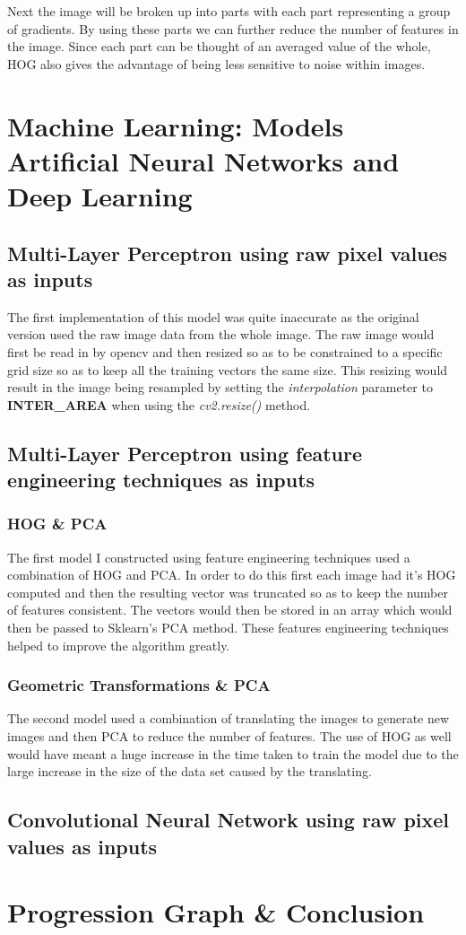 \documentclass[notitlepage]{report}
\begin{document}
Next the image will be broken up into parts with each part representing a group of gradients. By using these parts we can further reduce the number of features in the image. Since each part can be thought of an averaged value of the whole, HOG also gives the advantage of being less sensitive to noise within images.

\chapter{Machine Learning: Models Artificial Neural Networks and Deep Learning}
\section{Multi-Layer Perceptron using raw pixel values as inputs}
The first implementation of this model was quite inaccurate as the original version used the raw image data from the whole image. The raw image would first be read in by opencv and then resized so as to be constrained to a specific grid size so as to keep all the training vectors the same size. This resizing would result in the image being resampled by setting the \textit{interpolation} parameter to \textbf{INTER\_AREA} when using the \textit{cv2.resize()} method.
\section{Multi-Layer Perceptron using feature engineering techniques as inputs}
\subsection{HOG \& PCA}
The first model I constructed using feature engineering techniques used a combination of HOG and PCA. In order to do this first each image had it's HOG computed and then the resulting vector was truncated so as to keep the number of features consistent. The vectors would then be stored in an array which would then be passed to Sklearn's PCA method. These features engineering techniques helped to improve the algorithm greatly.
\subsection{Geometric Transformations \& PCA}
The second model used a combination of translating the images to generate new images and then PCA to reduce the number of features. The use of HOG as well would have meant a huge increase in the time taken to train the model due to the large increase in the size of the data set caused by the translating.
\section{Convolutional Neural Network using raw pixel values as inputs}
\chapter{Progression Graph \& Conclusion}
\end{document}
